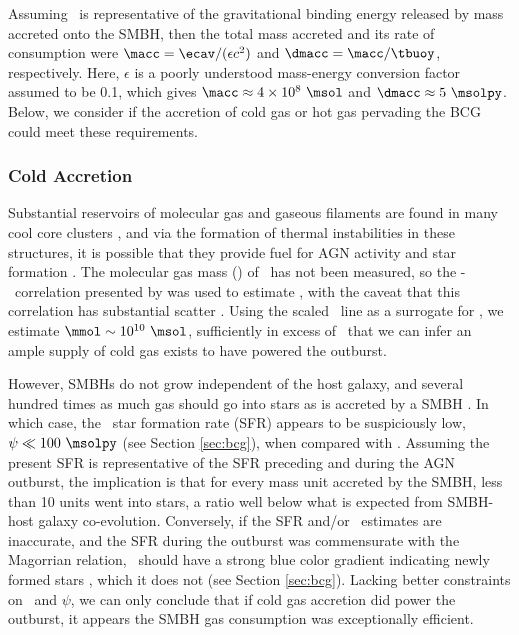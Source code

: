 \documentclass[11pt, preprint]{aastex}
\begin{document}
Assuming \ecav\ is representative of the gravitational binding energy
released by mass accreted onto the SMBH, then the total mass accreted
and its rate of consumption were $\macc = \ecav/(\epsilon c^2)$ and
$\dmacc = \macc/\tbuoy$, respectively. Here, $\epsilon$ is a poorly
understood mass-energy conversion factor assumed to be 0.1, which
gives $\macc \approx 4 \times 10^8 ~\msol$ and $\dmacc \approx 5
~\msolpy$. Below, we consider if the accretion of cold gas or hot gas
pervading the BCG could meet these requirements.

\subsubsection{Cold Accretion}

Substantial reservoirs of molecular gas and gaseous filaments are
found in many cool core clusters \citep{crawford99, edge01}, and via
the formation of thermal instabilities in these structures, it is
possible that they provide fuel for AGN activity and star formation
\citep[\eg][]{pizzolato05, 2010arXiv1003.4181P}. The molecular gas
mass (\mmol) of \rbs\ has not been measured, so the
\halpha-\mmol\ correlation presented by \citet{edge01} was used to
estimate \mmol, with the caveat that this correlation has substantial
scatter \citep{salome03}. Using the scaled \hbeta\ line as a surrogate
for \halpha, we estimate $\mmol \sim 10^{10} ~\msol$, sufficiently in
excess of \macc\ that we can infer an ample supply of cold gas exists
to have powered the outburst.

However, SMBHs do not grow independent of the host galaxy, and several
hundred times as much gas should go into stars as is accreted by a
SMBH \citep{1995ARA&A..33..581K, magorrian}. In which case, the
\rbs\ star formation rate (SFR) appears to be suspiciously low, $\psi
\ll 100 ~\msolpy$ (see Section \ref{sec:bcg}), when compared with
\dmacc. Assuming the present SFR is representative of the SFR
preceding and during the AGN outburst, the implication is that for
every mass unit accreted by the SMBH, less than 10 units went into
stars, a ratio well below what is expected from SMBH-host galaxy
co-evolution. Conversely, if the SFR and/or \dmacc\ estimates are
inaccurate, and the SFR during the outburst was commensurate with the
Magorrian relation, \rbs\ should have a strong blue color gradient
indicating newly formed stars \citep{rafferty08}, which it does not
(see Section \ref{sec:bcg}). Lacking better constraints on \mmol\ and
$\psi$, we can only conclude that if cold gas accretion did power the
outburst, it appears the SMBH gas consumption was exceptionally
efficient.
\end{document}

